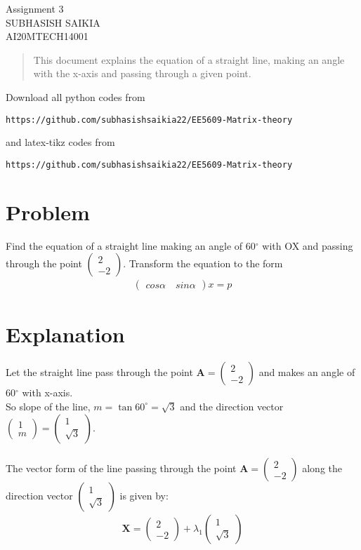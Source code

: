 \documentclass[journal,12pt,twocolumn]{IEEEtran}
\newcommand{\myvec}[1]{\ensuremath{\begin{pmatrix}#1\end{pmatrix}}}
\numberwithin{equation}{subsection}
\let\vec\mathbf
\begin{document}
\begin{center}
\huge Assignment 3\\
\large SUBHASISH SAIKIA\\
\large AI20MTECH14001\\
\end{center}
\vspace{0.5cm}
\begin{abstract}
This document explains the equation of a straight line, making an angle with the x-axis and passing through a given point.
\end{abstract}
\vspace{0.5cm}
Download all python codes from 
\begin{lstlisting}
https://github.com/subhasishsaikia22/EE5609-Matrix-theory
\end{lstlisting}
%
and latex-tikz codes from 
\begin{lstlisting}
https://github.com/subhasishsaikia22/EE5609-Matrix-theory
\end{lstlisting}
%
\vspace{0.5cm}
\section{Problem}
Find the equation of a straight line making an angle of 60$^{\circ}$
with OX and passing through the point $\myvec{2 \\-2}$. Transform the equation to the form 
\begin{align}
     \myvec{ cos\alpha \quad sin\alpha}x=p
\end{align} 

\section{Explanation}
Let the straight line pass through the point $\vec{A}=\myvec{2 \\-2}$ and makes an angle of 60$^{\circ}$ with x-axis.\\
So slope of the line, $m=\tan 60^{\circ}=\sqrt{3}$ and the direction vector  $\myvec{1 \\m} = \myvec{1 \\\sqrt{3}}$.\\\\
The vector form of the line passing through the point $\vec{A}=\myvec{2 \\-2}$ along the direction vector  $\myvec{1 \\\sqrt{3}}$ is given by:
\begin{align}
\vec{X}=\myvec{2 \\-2}+ \lambda_1\myvec{1 \\\sqrt{3}}
\end{align} 
\end{document}
